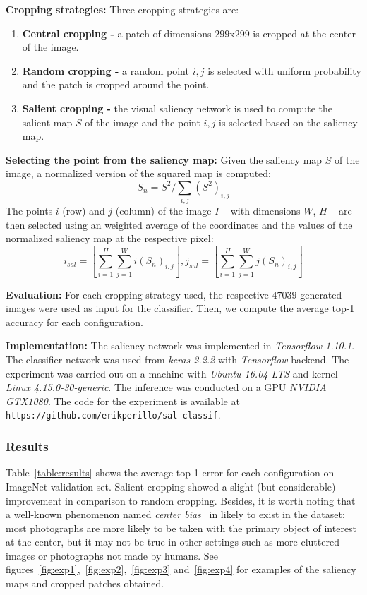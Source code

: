\documentclass[12pt]{article}
\begin{document}
\textbf{Cropping strategies:}
Three cropping strategies are:
\begin{enumerate}
    \item \textbf{Central cropping -} a patch of dimensions $299$x$299$ is cropped at the center of the image.
    \item \textbf{Random cropping -} a random point $i, j$ is selected with uniform probability and the patch is cropped around the point.
    \item \textbf{Salient cropping -}
        the visual saliency network is used to compute the salient map $S$ of the image and the point $i, j$ is selected based on the saliency map.
\end{enumerate}


\textbf{Selecting the point from the saliency map:}
Given the saliency map $S$ of the image, a normalized version of the squared map is computed:
$$S_n = S^2/\sum\limits_{i,j}\left({S^2}\right)_{i,j}$$
The points $i$ (row) and $j$ (column) of the image $I$ -- with dimensions $W$, $H$ --
are then selected using an weighted average of the coordinates and the values of the normalized saliency map
at the respective pixel:
$$i_{sal} = \left\lfloor \sum\limits_{i=1}^H\sum\limits_{j=1}^W i\left(S_n\right)_{i,j} \right\rfloor,
  j_{sal} = \left\lfloor \sum\limits_{i=1}^H\sum\limits_{j=1}^W j\left(S_n\right)_{i,j} \right\rfloor$$

\textbf{Evaluation:}
For each cropping strategy used, the respective $47039$ generated images were used as input for the classifier.
Then, we compute the average top-1 accuracy for each configuration.

\textbf{Implementation:}
The saliency network was implemented in \emph{Tensorflow 1.10.1}.
The classifier network was used from \emph{keras 2.2.2} with \emph{Tensorflow} backend.
The experiment was carried out on a machine with \emph{Ubuntu 16.04 LTS} and kernel \emph{Linux 4.15.0-30-generic}.
The inference was conducted on a GPU \emph{NVIDIA GTX1080}.
The code for the experiment is available at \texttt{https://github.com/erikperillo/sal-classif}.

\subsubsection{Results}
Table~\ref{table:results} shows the average top-1 error for each configuration on ImageNet validation set.
Salient cropping showed a slight (but considerable) improvement in comparison to random cropping.
Besides, it is worth noting that a well-known phenomenon named \emph{center bias}~\cite{ref:centerbias}
in likely to exist in
the dataset: most photographs are more likely to be taken with the primary object of interest at the center,
but it may not be true in other settings such as more cluttered images or photographs not made by humans.
See figures~\ref{fig:exp1},~\ref{fig:exp2},~\ref{fig:exp3} and~\ref{fig:exp4}
for examples of the saliency maps and cropped patches obtained.
\end{document}
